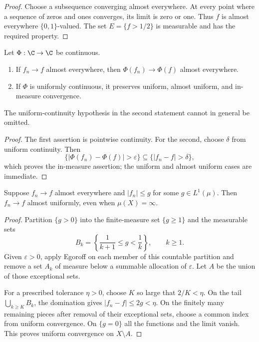 \begin{proof}
Choose a subsequence converging almost everywhere. At every point where a sequence of zeros and ones converges, its limit is zero or one. Thus $f$ is almost everywhere $\{0,1\}$-valued. The set $E=\{f>1/2\}$ is measurable and has the required property.
\end{proof}

\begin{prop}
Let $\Phi:\C\to\C$ be continuous.
\begin{enumerate}
  \item If $f_n\to f$ almost everywhere, then $\Phi(f_n)\to\Phi(f)$ almost everywhere.
  \item If $\Phi$ is uniformly continuous, it preserves uniform, almost uniform, and in-measure convergence.
\end{enumerate}
The uniform-continuity hypothesis in the second statement cannot in general be omitted.
\end{prop}

\begin{proof}
The first assertion is pointwise continuity. For the second, choose $\delta$ from uniform continuity. Then
\[
\{|\Phi(f_n)-\Phi(f)|>\varepsilon\}
 \subseteq\{|f_n-f|>\delta\},
\]
which proves the in-measure assertion; the uniform and almost uniform cases are immediate.
\end{proof}

\begin{thm}
Suppose $f_n\to f$ almost everywhere and $|f_n|\leq g$ for some $g\in L^1(\mu)$. Then $f_n\to f$ almost uniformly, even when $\mu(X)=\infty$.
\end{thm}

\begin{proof}
Partition $\{g>0\}$ into the finite-measure set $\{g\geq1\}$ and the measurable sets
\[
B_k=\left\{\frac1{k+1}\leq g<\frac1k\right\},
\qquad k\geq1.
\]
Given $\varepsilon>0$, apply Egoroff on each member of this countable partition and remove a set $A_k$ of measure below a summable allocation of $\varepsilon$. Let $A$ be the union of those exceptional sets.

For a prescribed tolerance $\eta>0$, choose $K$ so large that $2/K<\eta$. On the tail $\bigcup_{k\geq K}B_k$, the domination gives $|f_n-f|\leq2g<\eta$. On the finitely many remaining pieces after removal of their exceptional sets, choose a common index from uniform convergence. On $\{g=0\}$ all the functions and the limit vanish. This proves uniform convergence on $X\setminus A$.
\end{proof}

